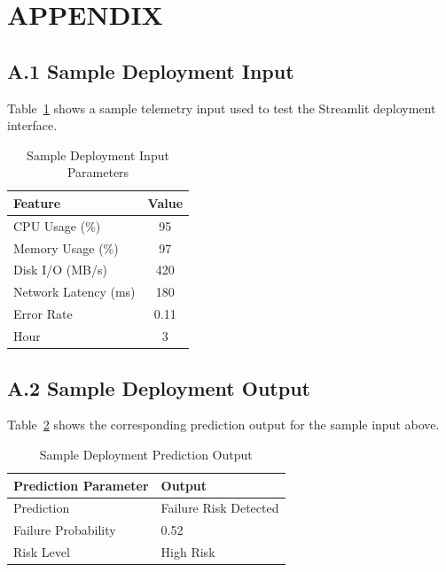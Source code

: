 \documentclass[12pt,letterpaper]{report}
\begin{document}
\chapter*{APPENDIX}

\section*{A.1 Sample Deployment Input}

Table~\ref{tab:sample_input} shows a sample telemetry input used to test the Streamlit deployment interface.

\begin{table}[H]
\centering
\caption{Sample Deployment Input Parameters}
\label{tab:sample_input}
\begin{tabular}{lc}
\toprule
\textbf{Feature} & \textbf{Value} \\
\midrule
CPU Usage (\%) & 95 \\
Memory Usage (\%) & 97 \\
Disk I/O (MB/s) & 420 \\
Network Latency (ms) & 180 \\
Error Rate & 0.11 \\
Hour & 3 \\
\bottomrule
\end{tabular}
\end{table}

\section*{A.2 Sample Deployment Output}

Table~\ref{tab:sample_output} shows the corresponding prediction output for the sample input above.

\begin{table}[H]
\centering
\caption{Sample Deployment Prediction Output}
\label{tab:sample_output}
\begin{tabular}{ll}
\toprule
\textbf{Prediction Parameter} & \textbf{Output} \\
\midrule
Prediction & Failure Risk Detected \\
Failure Probability & 0.52 \\
Risk Level & High Risk \\
\bottomrule
\end{tabular}
\end{table}
\end{document}
